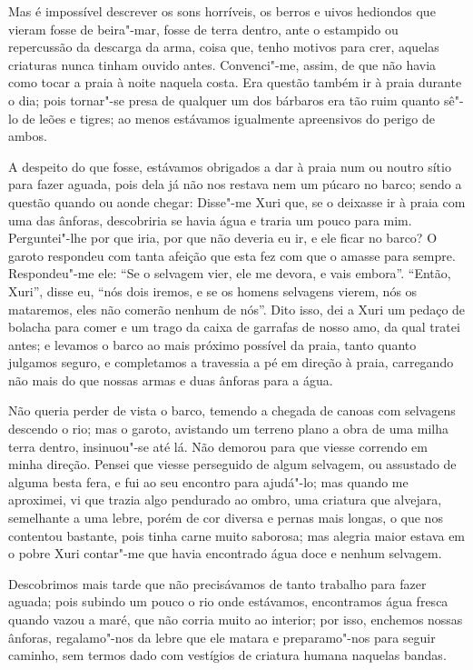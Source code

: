 Mas é impossível descrever os sons horríveis, os berros e uivos
hediondos que vieram fosse de beira"-mar, fosse de terra dentro, ante o
estampido ou repercussão da descarga da arma, coisa que, tenho motivos
para crer, aquelas criaturas nunca tinham ouvido antes. Convenci"-me,
assim, de que não havia como tocar a praia à noite naquela costa. Era
questão também ir à praia durante o dia; pois tornar"-se presa de
qualquer um dos bárbaros era tão ruim quanto sê"-lo de leões e tigres; ao
menos estávamos igualmente apreensivos do perigo de ambos.

A despeito do que fosse, estávamos obrigados a dar à praia num ou noutro
sítio para fazer aguada, pois dela já não nos restava nem um púcaro no
barco; sendo a questão quando ou aonde chegar: Disse"-me Xuri que, se o
deixasse ir à praia com uma das ânforas, descobriria se havia água e
traria um pouco para mim. Perguntei"-lhe por que iria, por que não
deveria eu ir, e ele ficar no barco? O garoto respondeu com tanta
afeição que esta fez com que o amasse para sempre. Respondeu"-me ele:
``Se o selvagem vier, ele me devora, e vais embora''. ``Então, Xuri'',
disse eu, ``nós dois iremos, e se os homens selvagens vierem, nós os
mataremos, eles não comerão nenhum de nós''. Dito isso, dei a Xuri um
pedaço de bolacha para comer e um trago da caixa de garrafas de nosso
amo, da qual tratei antes; e levamos o barco ao mais próximo possível da
praia, tanto quanto julgamos seguro, e completamos a travessia a pé em
direção à praia, carregando não mais do que nossas armas e duas ânforas
para a água.

Não queria perder de vista o barco, temendo a chegada de canoas com
selvagens descendo o rio; mas o garoto, avistando um terreno plano a
obra de uma milha terra dentro, insinuou"-se até lá. Não demorou para que
viesse correndo em minha direção. Pensei que viesse perseguido de algum
selvagem, ou assustado de alguma besta fera, e fui ao seu encontro para
ajudá"-lo; mas quando me aproximei, vi que trazia algo pendurado ao
ombro, uma criatura que alvejara, semelhante a uma lebre, porém de cor
diversa e pernas mais longas, o que nos contentou bastante, pois tinha
carne muito saborosa; mas alegria maior estava em o pobre Xuri contar"-me
que havia encontrado água doce e nenhum selvagem.

Descobrimos mais tarde que não precisávamos de tanto trabalho para fazer
aguada; pois subindo um pouco o rio onde estávamos, encontramos água
fresca quando vazou a maré, que não corria muito ao interior; por isso,
enchemos nossas ânforas, regalamo"-nos da lebre que ele matara e
preparamo"-nos para seguir caminho, sem termos dado com vestígios de
criatura humana naquelas bandas.

